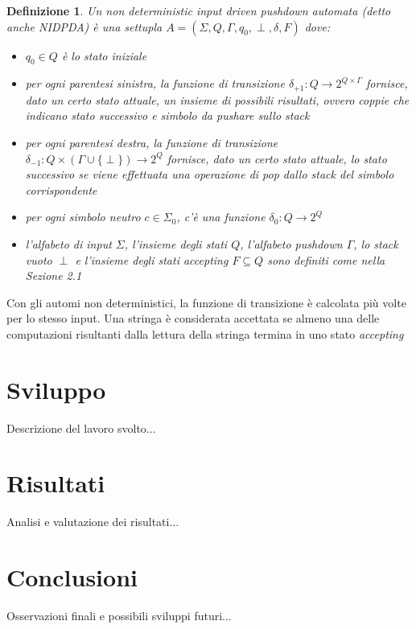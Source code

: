 \documentclass[a4paper,12pt]{report}
\newtheorem{definition}{Definizione}[chapter]
\begin{document}
    \begin{definition}
        Un \textit{non deterministic input driven pushdown automata} (detto anche \textit{NIDPDA}) è una settupla $A = (\Sigma, Q, \Gamma, q_0, \perp, \delta, F)$ dove:
        \begin{itemize}
            \item $q_{0} \in Q$ è lo stato iniziale
            \item per ogni parentesi sinistra, la funzione di transizione $\delta_{+1} : Q \rightarrow 2^{Q \times \Gamma}$ fornisce, dato un certo stato attuale, un insieme di possibili risultati, ovvero coppie che indicano stato successivo e simbolo da pushare sullo stack
            \item per ogni parentesi destra, la funzione di transizione $\delta_{-1} : Q \times (\Gamma \cup \{\perp\}) \rightarrow 2^Q$ fornisce, dato un certo stato attuale, lo stato successivo se viene effettuata una operazione di pop dallo stack del simbolo corrispondente
            \item per ogni simbolo neutro $c \in \Sigma_{0}$, c'è una funzione $\delta_{0} : Q \rightarrow 2^Q$
            \item l'alfabeto di input $\Sigma$, l'insieme degli stati $Q$, l'alfabeto pushdown $\Gamma$, lo stack vuoto $\perp$ e l'insieme degli stati accepting $F \subseteq Q$ sono definiti come nella Sezione 2.1
        \end{itemize}
    \end{definition}

    Con gli automi non deterministici, la funzione di transizione è calcolata più volte per lo stesso input. Una stringa è considerata accettata se almeno una delle computazioni risultanti dalla lettura della stringa termina in uno stato \textit{accepting}


    \chapter{Sviluppo}
    Descrizione del lavoro svolto...

    \chapter{Risultati}
    Analisi e valutazione dei risultati...

    \chapter{Conclusioni}
    Osservazioni finali e possibili sviluppi futuri...
\end{document}
